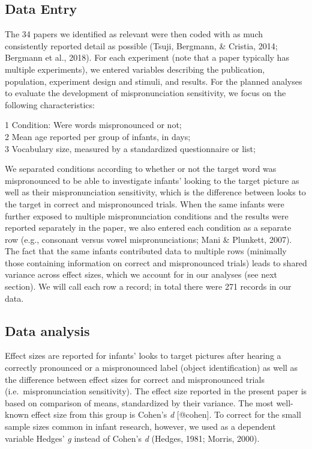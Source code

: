 \documentclass[man]{apa6}
\theoremstyle{definition}
\theoremstyle{definition}
\theoremstyle{definition}
\theoremstyle{remark}
\begin{document}
\subsection{Data Entry}\label{data-entry}

The 34 papers we identified as relevant were then coded with as much
consistently reported detail as possible (Tsuji, Bergmann, \& Cristia,
2014; Bergmann et al., 2018). For each experiment (note that a paper
typically has multiple experiments), we entered variables describing the
publication, population, experiment design and stimuli, and results. For
the planned analyses to evaluate the development of mispronunciation
sensitivity, we focus on the following characteristics:

1 Condition: Were words mispronounced or not;\\
2 Mean age reported per group of infants, in days;\\
3 Vocabulary size, measured by a standardized questionnaire or list;

We separated conditions according to whether or not the target word was
mispronounced to be able to investigate infants' looking to the target
picture as well as their mispronunciation sensitivity, which is the
difference between looks to the target in correct and mispronounced
trials. When the same infants were further exposed to multiple
mispronunciation conditions and the results were reported separately in
the paper, we also entered each condition as a separate row (e.g.,
consonant versus vowel mispronunciations; Mani \& Plunkett, 2007). The
fact that the same infants contributed data to multiple rows (minimally
those containing information on correct and mispronounced trials) leads
to shared variance across effect sizes, which we account for in our
analyses (see next section). We will call each row a record; in total
there were 271 records in our data.

\subsection{Data analysis}\label{data-analysis}

Effect sizes are reported for infants' looks to target pictures after
hearing a correctly pronounced or a mispronounced label (object
identification) as well as the difference between effect sizes for
correct and mispronounced trials (i.e.~mispronunciation sensitivity).
The effect size reported in the present paper is based on comparison of
means, standardized by their variance. The most well-known effect size
from this group is Cohen's \emph{d} {[}@cohen{]}. To correct for the
small sample sizes common in infant research, however, we used as a
dependent variable Hedges' \emph{g} instead of Cohen's \emph{d} (Hedges,
1981; Morris, 2000).
\end{document}
